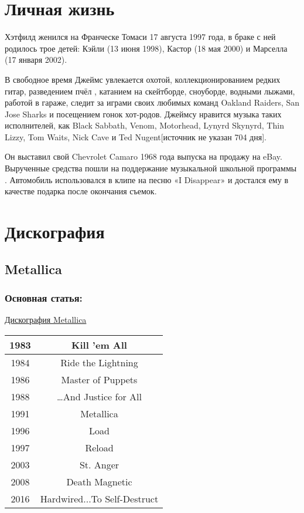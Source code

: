 \documentclass[a4paper,12pt,leqno]{article}
\theoremstyle{plain} %
\theoremstyle{definition} %
\theoremstyle{remark} %
\begin{document}
\section{Личная жизнь}

Хэтфилд женился на Франческе Томаси 17 августа 1997 года, в браке с ней родилось трое детей: Кэйли (13 июня 1998), Кастор (18 мая 2000) и Марселла (17 января 2002).

В свободное время Джеймс увлекается охотой, коллекционированием редких гитар, разведением пчёл \cite{5}, катанием на скейтборде, сноуборде, водными лыжами, работой в гараже, следит за играми своих любимых команд Oakland Raiders, San Jose Sharks и посещением гонок хот-родов. Джеймсу нравится музыка таких исполнителей, как Black Sabbath, Venom, Motorhead, Lynyrd Skynyrd, Thin Lizzy, Tom Waits, Nick Cave и Ted Nugent[источник не указан 704 дня].

Он выставил свой Chevrolet Camaro 1968 года выпуска на продажу на eBay. Вырученные средства пошли на поддержание музыкальной школьной программы \cite{6}. Автомобиль использовался в клипе на песню «I Disappear» и достался ему в качестве подарка после окончания съемок.

\section{Дискография}

\subsection{Metallica}

\subsubsection{Основная статья:}  \href{https://ru.wikipedia.org/wiki/%D0%94%D0%B8%D1%81%D0%BA%D0%BE%D0%B3%D1%80%D0%B0%D1%84%D0%B8%D1%8F_Metallica}{Дискография Metallica}

\begin{tabular}{|c|c|}
	
\hline 1983 & Kill 'em All \\
\hline 1984 & Ride the Lightning \\
\hline 1986 & Master of Puppets \\
\hline 1988 & …And Justice for All \\
\hline 1991 & Metallica \\
\hline 1996 & Load \\
\hline 1997 & Reload \\
\hline 2003 & St. Anger \\
\hline 2008 & Death Magnetic \\
\hline 2016 & Hardwired...To Self-Destruct \\
\hline
\end{tabular}
 
\end{document}
